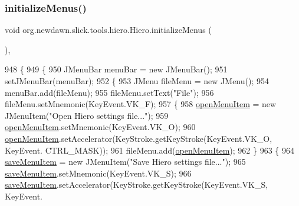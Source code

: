 \subsubsection{\texorpdfstring{initialize\+Menus()}{initializeMenus()}}
{\footnotesize\ttfamily void org.\+newdawn.\+slick.\+tools.\+hiero.\+Hiero.\+initialize\+Menus (\begin{DoxyParamCaption}{ }\end{DoxyParamCaption})\hspace{0.3cm}{\ttfamily [inline]}, {\ttfamily [private]}}


\begin{DoxyCode}
948                                     \{
949         \{
950             JMenuBar menuBar = \textcolor{keyword}{new} JMenuBar();
951             setJMenuBar(menuBar);
952             \{
953                 JMenu fileMenu = \textcolor{keyword}{new} JMenu();
954                 menuBar.add(fileMenu);
955                 fileMenu.setText(\textcolor{stringliteral}{"File"});
956                 fileMenu.setMnemonic(KeyEvent.VK\_F);
957                 \{
958                     \mbox{\hyperlink{classorg_1_1newdawn_1_1slick_1_1tools_1_1hiero_1_1_hiero_afd5b856520d9a369e33589a7ba546e4b}{openMenuItem}} = \textcolor{keyword}{new} JMenuItem(\textcolor{stringliteral}{"Open Hiero settings file..."});
959                     \mbox{\hyperlink{classorg_1_1newdawn_1_1slick_1_1tools_1_1hiero_1_1_hiero_afd5b856520d9a369e33589a7ba546e4b}{openMenuItem}}.setMnemonic(KeyEvent.VK\_O);
960                     \mbox{\hyperlink{classorg_1_1newdawn_1_1slick_1_1tools_1_1hiero_1_1_hiero_afd5b856520d9a369e33589a7ba546e4b}{openMenuItem}}.setAccelerator(KeyStroke.getKeyStroke(KeyEvent.VK\_O, KeyEvent.
      CTRL\_MASK));
961                     fileMenu.add(\mbox{\hyperlink{classorg_1_1newdawn_1_1slick_1_1tools_1_1hiero_1_1_hiero_afd5b856520d9a369e33589a7ba546e4b}{openMenuItem}});
962                 \}
963                 \{
964                     \mbox{\hyperlink{classorg_1_1newdawn_1_1slick_1_1tools_1_1hiero_1_1_hiero_a718e4dc3618321c479640f1444da4964}{saveMenuItem}} = \textcolor{keyword}{new} JMenuItem(\textcolor{stringliteral}{"Save Hiero settings file..."});
965                     \mbox{\hyperlink{classorg_1_1newdawn_1_1slick_1_1tools_1_1hiero_1_1_hiero_a718e4dc3618321c479640f1444da4964}{saveMenuItem}}.setMnemonic(KeyEvent.VK\_S);
966                     \mbox{\hyperlink{classorg_1_1newdawn_1_1slick_1_1tools_1_1hiero_1_1_hiero_a718e4dc3618321c479640f1444da4964}{saveMenuItem}}.setAccelerator(KeyStroke.getKeyStroke(KeyEvent.VK\_S, KeyEvent.

\end{DoxyCode}

